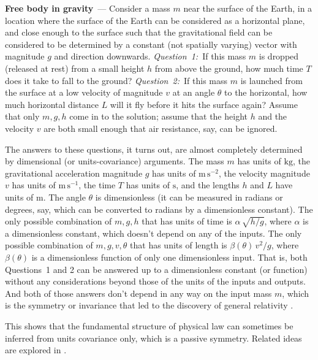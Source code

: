 \documentclass[11pt]{article}
\newcommand{\unit}[1]{\mathrm{#1}}
\newcommand{\kg}{\unit{kg}}
\newcommand{\m}{\unit{m}}
\newcommand{\s}{\unit{s}}
\renewcommand{\paragraph}[1]{\medskip\par\noindent\textbf{#1}~---}
\begin{document}
\paragraph{Free body in gravity}
Consider a mass $m$ near the surface of the Earth, in a location where the surface of the Earth can be considered as a horizontal plane, and close enough to the surface such that the gravitational field can be considered to be determined by a constant (not spatially varying) vector with magnitude $g$ and direction downwards.
\textsl{Question~1:}~If this mass $m$ is dropped (released at rest) from a small height $h$ from above the ground, how much time $T$ does it take to fall to the ground?
\textsl{Question~2:}~If this mass $m$ is launched from the surface at a low velocity of magnitude $v$ at an angle $\theta$ to the horizontal, how much horizontal distance $L$ will it fly before it hits the surface again?
Assume that only $m, g, h$ come in to the solution; assume that the height $h$ and the velocity $v$ are both small enough that air resistance, say, can be ignored.

The answers to these questions, it turns out, are almost completely determined by dimensional (or units-covariance) arguments.
The mass $m$ has units of $\kg$, the gravitational acceleration magnitude $g$ has units of $\m\,\s^{-2}$, the velocity magnitude $v$ has units of $\m\,\s^{-1}$, the time $T$ has units of $\s$, and the lengths $h$ and $L$ have units of $\m$.
The angle $\theta$ is dimensionless (it can be measured in radians or degrees, say, which can be converted to radians by a dimensionless constant).
The only possible combination of $m, g, h$ that has units of time is $\alpha\,\sqrt{h/g}$, where $\alpha$ is a dimensionless constant, which doesn't depend on any of the inputs.
The only possible combination of $m, g, v, \theta$ that has units of length is $\beta(\theta)\,v^2/g$, where $\beta(\theta)$ is a dimensionless function of only one dimensionless input.
That is, both Questions~1 and 2 can be answered up to a dimensionless constant (or function) without any considerations beyond those of the units of the inputs and outputs.
And both of those answers don't depend in any way on the input mass $m$, which is the symmetry or invariance that led to the discovery of general relativity \cite{gr}.

This shows that the fundamental structure of physical law can sometimes be inferred from units covariance only, which is a passive symmetry.  Related ideas are explored in \cite{villar2022dimensionless}.
\end{document}

